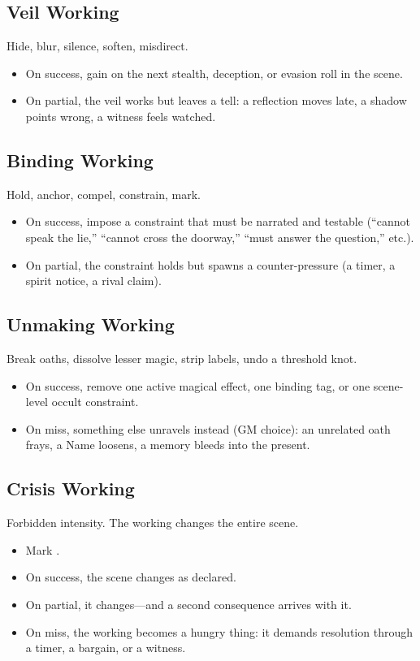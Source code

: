 \subsection{Veil Working}
Hide, blur, silence, soften, misdirect.
\begin{itemize}
  \item On success, gain  on the next stealth, deception, or evasion roll in the scene.
  \item On partial, the veil works but leaves a tell: a reflection moves late, a shadow points wrong, a witness feels watched.
\end{itemize}

\subsection{Binding Working}
Hold, anchor, compel, constrain, mark.
\begin{itemize}
  \item On success, impose a constraint that must be narrated and testable (``cannot speak the lie,'' ``cannot cross the doorway,'' ``must answer the question,'' etc.).
  \item On partial, the constraint holds but spawns a counter-pressure (a timer, a spirit notice, a rival claim).
\end{itemize}

\subsection{Unmaking Working}
Break oaths, dissolve lesser magic, strip labels, undo a threshold knot.
\begin{itemize}
  \item On success, remove one active magical effect, one binding tag, or one scene-level occult constraint.
  \item On miss, something else unravels instead (GM choice): an unrelated oath frays, a Name loosens, a memory bleeds into the present.
\end{itemize}

\subsection{Crisis Working}
Forbidden intensity. The working changes the entire scene.
\begin{itemize}
  \item Mark .
  \item On success, the scene changes as declared.
  \item On partial, it changes---and a second consequence arrives with it.
  \item On miss, the working becomes a hungry thing: it demands resolution through a timer, a bargain, or a witness.
\end{itemize}

